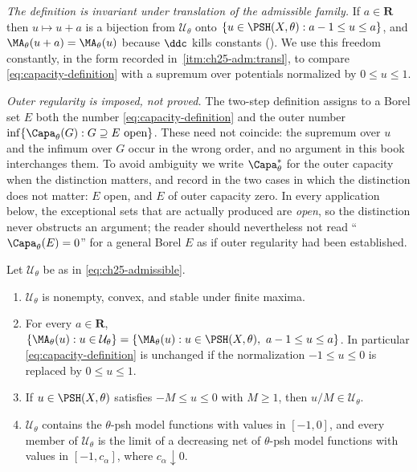 \emph{The definition is invariant under translation of the admissible
family.}  If $a\in\mathbf R$ then $u\mapsto u+a$ is a bijection from
$\mathcal U_\theta$ onto $\{u\in\PSH(X,\theta):a-1\leq u\leq a\}$, and
$\MA_\theta(u+a)=\MA_\theta(u)$ because $\ddc$ kills constants
().  We use this freedom constantly, in the form recorded
in \,\cref{itm:ch25-adm:transl}, to compare
\eqref{eq:capacity-definition} with a supremum over potentials normalized by
$0\leq u\leq1$.

\emph{Outer regularity is imposed, not proved.}  The two-step definition
assigns to a Borel set $E$ both the number \eqref{eq:capacity-definition}
and the outer number $\inf\{\Capa_\theta(G):G\supseteq E\ \text{open}\}$.
These need not coincide: the supremum over $u$ and the infimum over $G$
occur in the wrong order, and no argument in this book interchanges them.  To
avoid ambiguity we write $\Capa_\theta^*$ for the outer capacity when the
distinction matters, and record in  the two cases
in which the distinction does not matter: $E$ open, and $E$ of outer
capacity zero.  In every application below, the exceptional sets that are
actually produced are \emph{open}, so the distinction never obstructs an
argument; the reader should nevertheless not read
``$\Capa_\theta(E)=0$'' for a general Borel $E$ as if outer regularity
had been established.

\begin{lemma}
\label{lem:ch25-admissible-calculus}
Let $\mathcal U_\theta$ be as in \eqref{eq:ch25-admissible}.
\begin{enumerate}
\item\label{itm:ch25-adm:nonempty}
 $\mathcal U_\theta$ is nonempty, convex, and stable under finite maxima.
\item\label{itm:ch25-adm:transl}
 For every $a\in\mathbf R$,
 $\{\MA_\theta(u):u\in\mathcal U_\theta\}
   =\{\MA_\theta(u):u\in\PSH(X,\theta),\ a-1\leq u\leq a\}$.
 In particular \eqref{eq:capacity-definition} is unchanged if the
 normalization $-1\leq u\leq0$ is replaced by $0\leq u\leq1$.
\item\label{itm:ch25-adm:scale}
 If $u\in\PSH(X,\theta)$ satisfies $-M\leq u\leq0$ with $M\geq1$, then
 $u/M\in\mathcal U_\theta$.
\item\label{itm:ch25-adm:model}
 $\mathcal U_\theta$ contains the $\theta$-psh model functions with
 values in $[-1,0]$, and every member of $\mathcal U_\theta$ is the limit
 of a decreasing net of $\theta$-psh model functions with values in
 $[-1,c_\alpha]$, where $c_\alpha\downarrow0$.
\end{enumerate}
\end{lemma}

